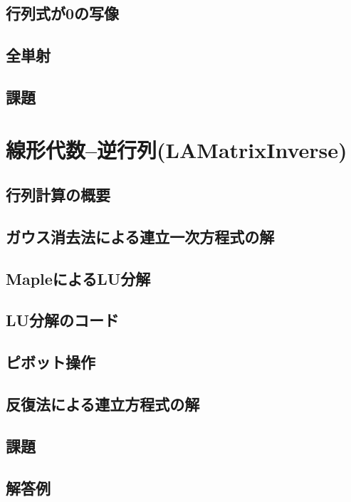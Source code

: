 \section{行列式が0の写像}
 
\section{全単射}
 
\section{課題}
 


\chapter{線形代数--逆行列(LAMatrixInverse)}
\section{行列計算の概要}
 
\section{ガウス消去法による連立一次方程式の解}
 
\section{MapleによるLU分解}
 
\section{LU分解のコード}
 
\section{ピボット操作}
 
\section{反復法による連立方程式の解}
 
\section{課題}
 
\section{解答例}
 









